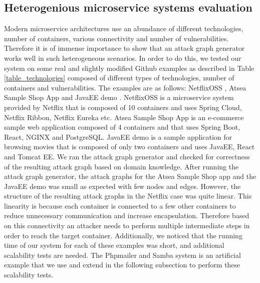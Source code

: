 \subsection{Heterogenious microservice systems evaluation}
\label{chap:heterogenious_systems}
Modern microservice architectures use an abundance of different technologies, number of containers, various connectivity and number of vulnerabilities. Therefore it is of immense importance to show that an attack graph generator works well in such heterogeneous scenarios. In order to do this, we tested our system on some real and slightly modified Github examples as described in Table \ref{table_technologies} composed of different types of technologies, number of containers and vulnerabilities. The examples are as follows: NetflixOSS \cite{netflixoss}, Atsea Sample Shop App \cite{atsea} and JavaEE demo \cite{java}. NetflixOSS is a microservice system provided by Netflix that is composed of 10 containers and uses Spring Cloud, Netflix Ribbon, Netflix Eureka etc. Atsea Sample Shop App is an e-commerce sample web application composed of 4 containers and that uses Spring Boot, React, NGINX and PostgreSQL. JavaEE demo is a sample application for browsing movies that is composed of only two containers and uses JavaEE, React and Tomcat EE. We ran the attack graph generator and checked for correctness of the resulting attack graph based on domain knowledge. After running the attack graph generator, the attack graphs for the Atsea Sample Shop app and the JavaEE demo was small as expected with few nodes and edges. However, the structure of the resulting attack graphs in the Netflix case was quite linear. This linearity is because each container is connected to a few other containers to reduce unnecessary communication and increase encapsulation. Therefore based on this connectivity an attacker needs to perform multiple intermediate steps in order to reach the target container. Additionally, we noticed that the running time of our system for each of these examples was short, and additional scalability tests are needed. The Phpmailer \cite{phpmailer} and Samba \cite{samba} system is an artificial example that we use and extend in the following subsection to perform these scalability tests.

